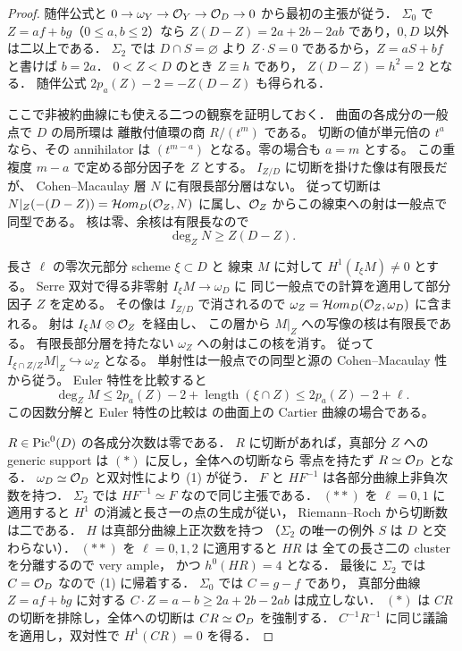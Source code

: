 \begin{proof}
随伴公式と
$0\to\omega_Y\to\mathcal O_Y\to\mathcal O_D\to0$
から最初の主張が従う．
$\Sigma_0$ で $Z=af+bg$（$0\le a,b\le2$）なら
$Z(D-Z)=2a+2b-2ab$ であり，$0,D$ 以外は二以上である．
$\Sigma_2$ では $D\cap S=\varnothing$ より
$Z\cdot S=0$ であるから，$Z=aS+bf$ と書けば $b=2a$．
$0<Z<D$ のとき $Z\equiv h$ であり，
$Z(D-Z)=h^2=2$ となる．
随伴公式
$2p_a(Z)-2=-Z(D-Z)$ も得られる．

ここで非被約曲線にも使える二つの観察を証明しておく．
曲面の各成分の一般点で $D$ の局所環は
離散付値環の商 $R/(t^m)$ である。
切断の値が単元倍の $t^a$ なら、その annihilator は
$(t^{m-a})$ となる。零の場合も $a=m$ とする。
この重複度 $m-a$ で定める部分因子を $Z$ とする。
$I_{Z/D}$ に切断を掛けた像は有限長だが、
Cohen--Macaulay 層 $N$ に有限長部分層はない。
従って切断は
$N|_Z(-(D-Z))=\mathcal{H}om_D(\mathcal O_Z,N)$
に属し、$\mathcal O_Z$ からこの線束への射は一般点で同型である。
核は零、余核は有限長なので
\[
 \deg_Z N\ge Z(D-Z).                                      \tag{*}
\]

長さ $\ell$ の零次元部分 scheme $\xi\subset D$ と
線束 $M$ に対して $H^1(I_\xi M)\ne0$ とする。
Serre 双対で得る非零射 $I_\xi M\to\omega_D$ に
同じ一般点での計算を適用して部分因子 $Z$ を定める。
その像は $I_{Z/D}$ で消されるので
$\omega_Z=\mathcal{H}om_D(\mathcal O_Z,\omega_D)$ に含まれる。
射は $I_\xi M\otimes\mathcal O_Z$ を経由し、
この層から $M|_Z$ への写像の核は有限長である。
有限長部分層を持たない $\omega_Z$ への射はこの核を消す。
従って $I_{\xi\cap Z/Z}M|_Z\hookrightarrow\omega_Z$ となる。
単射性は一般点での同型と源の Cohen--Macaulay 性から従う。
Euler 特性を比較すると
\[
 \deg_Z M\le 2p_a(Z)-2+\operatorname{length}(\xi\cap Z)
             \le 2p_a(Z)-2+\ell .                         \tag{**}
\]
この因数分解と Euler 特性の比較は
\cite[補題2.3--2.4および定理1.1の証明]{CFHRCurveEmbeddings1999}
の曲面上の Cartier 曲線の場合である。

$R\in\operatorname{Pic}^0(D)$ の各成分次数は零である．
$R$ に切断があれば，真部分 $Z$ への
generic support は $(*)$ に反し，全体への切断なら
零点を持たず $R\simeq\mathcal O_D$ となる．
$\omega_D\simeq\mathcal O_D$ と双対性により (1) が従う．
$F$ と $HF^{-1}$ は各部分曲線上非負次数を持つ．
$\Sigma_2$ では $HF^{-1}\simeq F$ なので同じ主張である．
$(**)$ を $\ell=0,1$ に適用すると
$H^1$ の消滅と長さ一の点の生成が従い，
Riemann--Roch から切断数は二である．
$H$ は真部分曲線上正次数を持つ
（$\Sigma_2$ の唯一の例外 $S$ は $D$ と交わらない）．
$(**)$ を $\ell=0,1,2$ に適用すると $HR$ は
全ての長さ二の cluster を分離するので very ample，
かつ $h^0(HR)=4$ となる．
最後に $\Sigma_2$ では $C=\mathcal O_D$ なので (1) に帰着する．
$\Sigma_0$ では $C=g-f$ であり，
真部分曲線 $Z=af+bg$ に対する
$C\cdot Z=a-b\ge 2a+2b-2ab$ は成立しない．
$(*)$ は $CR$ の切断を排除し，全体への切断は
$CR\simeq\mathcal O_D$ を強制する．
$C^{-1}R^{-1}$ に同じ議論を適用し，双対性で
$H^1(CR)=0$ を得る．
\end{proof}

